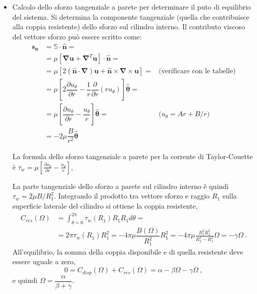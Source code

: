 \begin{itemize}
\item Calcolo dello sforzo tangenziale a parete per determinare il puto di equilibrio del sistema. Si determina la componente tangenziale (quella che contribuisce alla coppia resistente)
dello sforzo sul cilindro interno.
Il contributo viscoso del vettore sforzo può essere scritto come:
\begin{equation}
\begin{aligned}
  \bm{s_n} & = \mathbb{S} \cdot \bm{\hat{n}} = \\
           & = \mu [\bm{\nabla} \bm{u} + \bm{\nabla}^T \bm{u}] \cdot \bm{\hat{n}} = \\
           & = \mu \left[ 2 (\bm{\hat{n}} \cdot \bm{\nabla} ) \bm{u} + \bm{\hat{n}} \times \bm{\nabla} \times \bm{u}  \right] = &  \text{(verificare con le tabelle)} \\
           & = \mu \left[ 2 \dfrac{\partial u_\theta}{\partial r} - \dfrac{1}{r} 
    \dfrac{\partial}{\partial r} (r u_\theta) \right] \bm{\hat{\theta}} = \\
           & = \mu \left[ \dfrac{\partial u_\theta}{\partial r} - \dfrac{u_\theta}{r} \right] \bm{\hat{\theta}} = &  \text{($u_\theta = A r + B / r$)}\\
           & = - 2 \mu \dfrac{B}{r^2} \bm{\hat{\theta}} 
\end{aligned}
\end{equation}
%
\begin{remark}
 La formula dello sforzo tangenziale a parete per la corrente di Taylor-Couette è $\tau_w = \mu \left[ \frac{\partial u_\theta}{\partial r} - \frac{u_\theta}{r} \right]$,
\end{remark}
%
La parte tangenziale dello sforzo a parete sul cilindro interno è quindi $\tau_w = 
2 \mu {B}/{R_1^2}$. Integrando il prodotto tra vettore sforzo e raggio $R_1$ sulla
 superficie laterale del cilindro si ottiene la coppia resistente,
\begin{equation}
\begin{aligned}
 C_{res}(\Omega) & = \int_{\theta=0}^{2\pi} \tau_w(R_1) R_1 R_1 d\theta  = \\ & = 2\pi \tau_w(R_1) R_1^2 = -4\pi \mu \dfrac{B(\Omega)}{R_1^2}R_1^2 =  -4\pi \mu  \frac{R_1^2 R_2^2}{R_2^2-R_1^2} \Omega  = - \gamma \Omega \ .
\end{aligned}
\end{equation}
 All'equilibrio, la somma della coppia disponibile e di quella resistente deve essere uguale a zero,
%
\begin{equation}
 0 = C_{disp}(\Omega) + C_{res}(\Omega) = \alpha - \beta \Omega -  \gamma \Omega \ ,
\end{equation}
%
e quindi $\Omega = \dfrac{\alpha}{\beta + \gamma}$.



\end{itemize}

